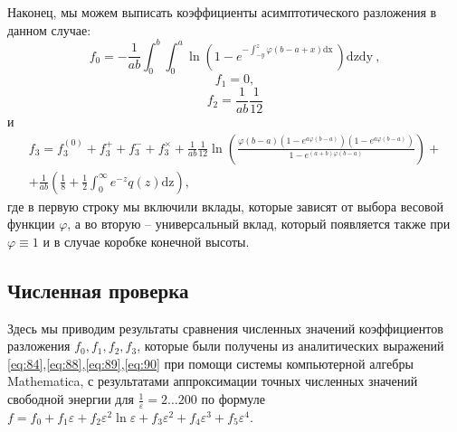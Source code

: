 \documentclass{article}
\newcommand{\dx}{\mathrm{dx}~}
\newcommand{\dy}{\mathrm{dy}~}
\newcommand{\dz}{\mathrm{dz}}
\begin{document}
Наконец, мы можем выписать коэффициенты асимптотического разложения в данном случае:
\begin{equation}
  \label{eq:84}
  f_{0}= -\frac{1}{ab}\int_{0}^{b}\int_{0}^{a}\ln
  \left(1-e^{-\int_{-y}^{z}\varphi\left(b-a+x\right)\dx} \right)\dz\dy,
\end{equation}
\begin{equation}
  \label{eq:88}
  f_{1}=0,
\end{equation}
\begin{equation}
  \label{eq:89}
  f_{2}=\frac{1}{ab}\frac{1}{12}
\end{equation}
и
\begin{multline}
  \label{eq:90}
  f_{3}=f^{(0)}_{3}+f^{+}_{3}+f^{-}_{3}+f^{\times}_{3}+
  \frac{1}{ab}\frac{1}{12}\ln\left(\frac{\varphi(b-a)\left(1-e^{a\varphi(b-a)}\right)\left(1-e^{a\varphi(b-a)}\right)}{1-e^{(a+b)\varphi(b-a)}}\right)+\\
  +\frac{1}{ab}\left(\frac{1}{8} +\frac{1}{2} \int_{0}^{\infty}
    e^{-z}q(z) \dz\right),
\end{multline}
где в первую строку мы включили  вклады, которые зависят от выбора весовой функции
$\varphi$, а во вторую -- универсальный вклад, который появляется также при
$\varphi\equiv 1$ и в случае коробке конечной высоты.

\subsection{Численная проверка}
\label{sec:numerical-checks-nonuniform}
Здесь мы приводим результаты  сравнения численных значений коэффициентов разложения
$f_{0},f_{1},f_{2},f_{3}$, которые были получены из аналитических выражений
\eqref{eq:84},\eqref{eq:88},\eqref{eq:89},\eqref{eq:90} при помощи системы компьютерной алгебры
Mathematica, с результатами аппроксимации точных численных значений свободной энергии для
 $\frac{1}{\varepsilon}=2\dots 200$
по формуле $f=f_{0}+
f_{1}\varepsilon+
f_{2}\varepsilon^{2}\ln\varepsilon+f_{3}\varepsilon^{2}+f_{4}\varepsilon^{3}+f_{5}\varepsilon^{4}$. 
\end{document}
